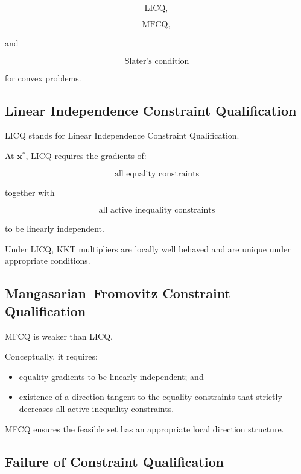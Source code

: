 \[
\boxed{
\text{LICQ},
}
\]

\[
\boxed{
\text{MFCQ},
}
\]

and

\[
\boxed{
\text{Slater's condition}
}
\]

for convex problems.

\subsection{Linear Independence Constraint Qualification}
\label{subsec:licq}

LICQ stands for Linear Independence Constraint Qualification.

At \(\mathbf{x}^*\), LICQ requires the gradients of:

\[
\boxed{
\text{all equality constraints}
}
\]

together with

\[
\boxed{
\text{all active inequality constraints}
}
\]

to be linearly independent.

Under LICQ, KKT multipliers are locally well behaved and are unique under
appropriate conditions.

\subsection{Mangasarian--Fromovitz Constraint Qualification}
\label{subsec:mfcq}

MFCQ is weaker than LICQ.

Conceptually, it requires:

\begin{itemize}
    \item equality gradients to be linearly independent; and
    \item existence of a direction tangent to the equality constraints
          that strictly decreases all active inequality constraints.
\end{itemize}

MFCQ ensures the feasible set has an appropriate local direction structure.

\subsection{Failure of Constraint Qualification}
\label{subsec:nlp-cq-failure}

